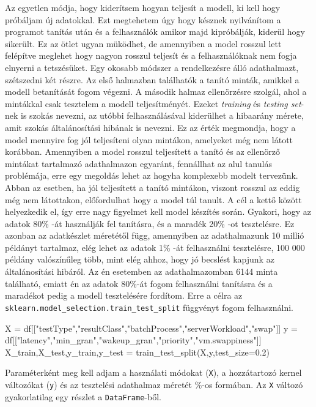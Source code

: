 Az egyetlen módja, hogy kiderítsem hogyan teljesít a modell, ki kell hogy próbáljam új adatokkal. 
Ezt megtehetem úgy hogy késznek nyilvánítom a programot tanítás után és a felhasználók amikor majd kipróbálják, kiderül hogy sikerült. Ez az ötlet ugyan müködhet, de amennyiben a model rosszul lett felépítve meglehet hogy nagyon rosszul teljesít és a felhasználóknak nem fogja elnyerni a tetszésüket. Egy okosabb módszer a rendelkezésre álló adathalmazt, szétszedni két részre. Az első halmazban találhatók a tanító minták, amikkel a modell betanítását fogom végezni. A második halmaz ellenörzésre szolgál, ahol a mintákkal csak tesztelem a modell teljesítményét.
Ezeket \textit{training} és \textit{testing set}-nek is szokás nevezni, az utóbbi felhasználásával kiderülhet a hibaarány mérete, amit szokás általánosítási hibának is nevezni. Ez az érték megmondja, hogy a model mennyire fog jól teljesíteni olyan mintákon, amelyeket még nem látott korábban.
Amennyiben a model rosszul teljesített a tanító és az ellenörző mintákat tartalmazó adathalmazon egyaránt, fennállhat az alul tanulás problémája, erre egy megoldás lehet az hogyha komplexebb modelt tervezünk. Abban az esetben, ha jól teljesített a tanító mintákon, viszont rosszul az eddig még nem látottakon, előfordulhat hogy a model túl tanult. A cél a kettő között helyezkedik el, így erre nagy figyelmet kell model készítés során.
Gyakori, hogy az adatok 80\% -át használják fel tanításra, és a maradék 20\% -ot tesztelésre. Ez azonban az adatkészlet méretétől függ, amennyiben az adathalmazunk 10 millió példányt tartalmaz, elég lehet az adatok 1\% -át felhasználni tesztelésre, 100 000 példány valószínűleg több, mint
elég ahhoz, hogy jó becslést kapjunk az általánosítási hibáról. Az én esetemben az adathalmazomban 6144 minta található, emiatt én az adatok 80\%-át fogom felhasználni tanításra és a maradékot pedig a modell tesztelésére fordítom. Erre a célra az \texttt{sklearn.model\_selection.train\_test\_split} függvényt fogom felhasználni. 

\begin{python}
X = df[["testType","resultClass","batchProcess","serverWorkload","swap"]]
y = df[["latency","min_gran","wakeup_gran","priority","vm.swappiness"]]
X_train,X_test,y_train,y_test = train_test_split(X,y,test_size=0.2)
\end{python}

Paraméterként meg kell adjam a használati módokat (\texttt{X}), a hozzátartozó kernel változókat (\texttt{y}) és az tesztelési adathalmaz méretét \%-os formában.
Az \texttt{X} változó gyakorlatilag egy részlet a \texttt{DataFrame}-ből. %

